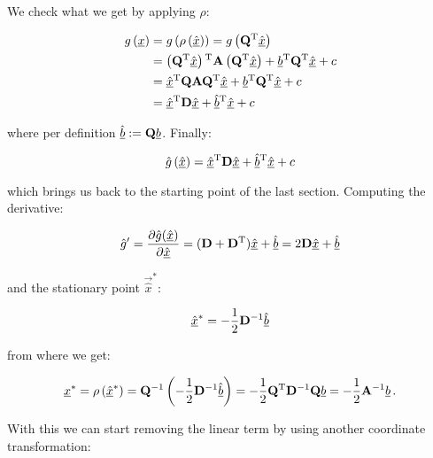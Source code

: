 \documentclass[a4paper,10pt]{article}
\begin{document}
We check what we get by applying $\rho$:

\begin{equation}
\begin{split}
 g\left(\underline{x}\right) & = g\left(\rho\left(\underline{\hat{x}}\right)\right)
                         = g\left(\mathbf{Q}{}^{\textnormal{T}} \underline{\hat{x}}\right) \\
 & = \left(\mathbf{Q}{}^{\textnormal{T}} \underline{\hat{x}}\right){}^{\textnormal{T}} \mathbf{A} \left(\mathbf{Q}{}^{\textnormal{T}} \underline{\hat{x}}\right)
   + \underline{b}{}^{\textnormal{T}} \mathbf{Q}{}^{\textnormal{T}} \underline{\hat{x}}
   + c \\
 & = \underline{\hat{x}}{}^{\textnormal{T}} \mathbf{Q} \mathbf{A} \mathbf{Q}{}^{\textnormal{T}} \underline{\hat{x}}
   + \underline{b}{}^{\textnormal{T}} \mathbf{Q}{}^{\textnormal{T}} \underline{\hat{x}}
   + c \\
 & = \underline{\hat{x}}{}^{\textnormal{T}} \mathbf{D} \underline{\hat{x}}
   + \underline{\hat{b}}{}^{\textnormal{T}} \underline{\hat{x}}
   + c
\end{split}
\end{equation}

where per definition $\underline{\hat{b}} := \mathbf{Q} \underline{b}$. Finally:

\begin{equation}
 \hat{g}\left(\underline{\hat{x}}\right) =
 \underline{\hat{x}}{}^{\textnormal{T}} \mathbf{D} \underline{\hat{x}}
 + \underline{\hat{b}}{}^{\textnormal{T}} \underline{\hat{x}}
 + c
\end{equation}

which brings us back to the starting point of the last section. Computing
the derivative:

\begin{equation}
 \hat{g}^\prime
 = \frac{\partial \hat{g}(\underline{\hat{x}})}{\partial \underline{\hat{x}}}
 = (\mathbf{D}+\mathbf{D}{}^{\textnormal{T}}) \underline{\hat{x}} + \underline{\hat{b}}
 = 2 \mathbf{D} \underline{\hat{x}} + \underline{\hat{b}}
\end{equation}

and the stationary point $\vec{\hat{x}}^{*}$:

\begin{equation}
 \underline{\hat{x}}^{*} = -\frac{1}{2} \mathbf{D}{}^{-1} \underline{\hat{b}}
\end{equation}

from where we get:

\begin{equation}
 \underline{x}^{*} = \rho\left(\underline{\hat{x}}^{*}\right)
             = \mathbf{Q}{}^{-1} \left(-\frac{1}{2} \mathbf{D}{}^{-1} \underline{\hat{b}}\right)
             = -\frac{1}{2} \mathbf{Q}{}^{\textnormal{T}} \mathbf{D}{}^{-1} \mathbf{Q} \underline{b}
             = -\frac{1}{2} \mathbf{A}{}^{-1} \underline{b} \,.
\end{equation}

With this we can start removing the linear term by using another
coordinate transformation:
\end{document}
